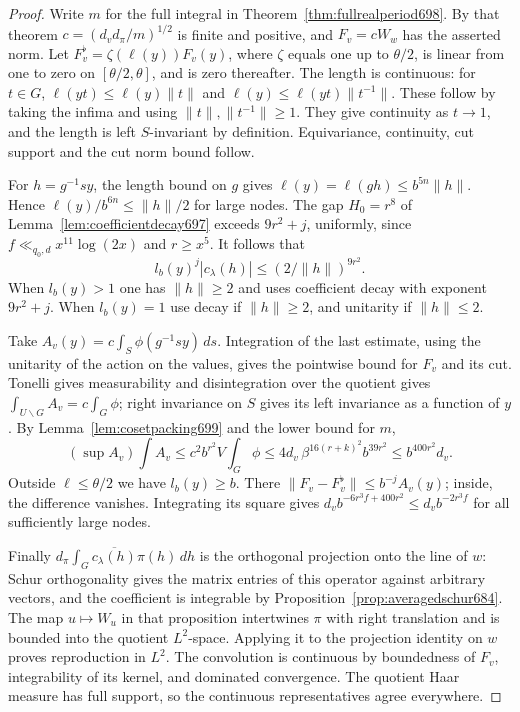 \documentclass[a4paper,11pt]{article}
\theoremstyle{definition}
\theoremstyle{remark}
\numberwithin{equation}{section}
\begin{document}
\begin{proof}
Write \(m\) for the full integral in
Theorem~\ref{thm:fullrealperiod698}. By that theorem
\(c=(d_v d_\pi/m)^{1/2}\) is finite and positive,
and \(F_v=c W_w\) has the asserted norm.
Let \(F_v^\flat=\zeta(\ell(y))F_v(y)\), where \(\zeta\)
equals one up to \(\theta/2\), is linear from one to zero
on \([\theta/2,\theta]\), and is zero thereafter.
The length is continuous: for \(t\in G\),
\(\ell(yt)\le\ell(y)\|t\|\) and
\(\ell(y)\le\ell(yt)\|t^{-1}\|\). These follow by taking
the infima and using \(\|t\|,\|t^{-1}\|\ge1\).
They give continuity as \(t\to1\), and the length is
left \(S\)-invariant by definition. Equivariance,
continuity, cut support and the cut norm bound follow.

For \(h=g^{-1}sy\), the length bound on \(g\) gives
\(\ell(y)=\ell(gh)\le b^{5n}\|h\|\). Hence
\(\ell(y)/b^{6n}\le\|h\|/2\) for large nodes.
The gap \(H_0=r^8\) of Lemma~\ref{lem:coefficientdecay697}
exceeds \(9r^2+j\), uniformly, since
\(f\ll_{q_0,d} x^{11}\log(2x)\) and \(r\ge x^5\).
It follows that
\[
       l_b(y)^j |c_\lambda(h)|\le (2/\|h\|)^{9r^2}.
\]
When \(l_b(y)>1\) one has \(\|h\|\ge2\) and uses coefficient
decay with exponent \(9r^2+j\). When \(l_b(y)=1\) use decay
if \(\|h\|\ge2\), and unitarity if \(\|h\|\le2\).

Take \(A_v(y)=c\int_S\phi(g^{-1}sy)\,ds\). Integration
of the last estimate, using the unitarity of the action
on the values, gives the pointwise bound for \(F_v\) and
its cut. Tonelli gives measurability and disintegration
over the quotient gives
\(\int_{U\backslash G} A_v=c\int_G\phi\); right invariance
on \(S\) gives its left invariance as a function of \(y\).
By Lemma~\ref{lem:cosetpacking699} and the lower bound for
\(m\),
\[
   (\sup A_v)\int A_v
   \le c^2 b^{r^2}V\int_G\phi
   \le 4d_v\,\beta^{16(r+k)^2} b^{39r^2}
   \le b^{400r^2}d_v .
\]
Outside \(\ell\le\theta/2\) we have \(l_b(y)\ge b\).
There \(\|F_v-F_v^\flat\|\le b^{-j}A_v(y)\);
inside, the difference vanishes. Integrating its square
gives \(d_v b^{-6r^3 f+400r^2}\le d_v b^{-2r^3 f}\)
for all sufficiently large nodes.

Finally \(d_\pi\int_G\overline{c_\lambda(h)}\pi(h)\,dh\)
is the orthogonal projection onto the line of \(w\):
Schur orthogonality gives the matrix entries of this
operator against arbitrary vectors, and the coefficient
is integrable by Proposition~\ref{prop:averagedschur684}.
The map \(u\mapsto W_u\) in that proposition intertwines
\(\pi\) with right translation and is bounded into the
quotient \(L^2\)-space. Applying it to the projection
identity on \(w\) proves reproduction in \(L^2\).
The convolution is continuous by boundedness of \(F_v\),
integrability of its kernel, and dominated convergence.
The quotient Haar measure has full support, so the
continuous representatives agree everywhere.
\end{proof}
\end{document}
